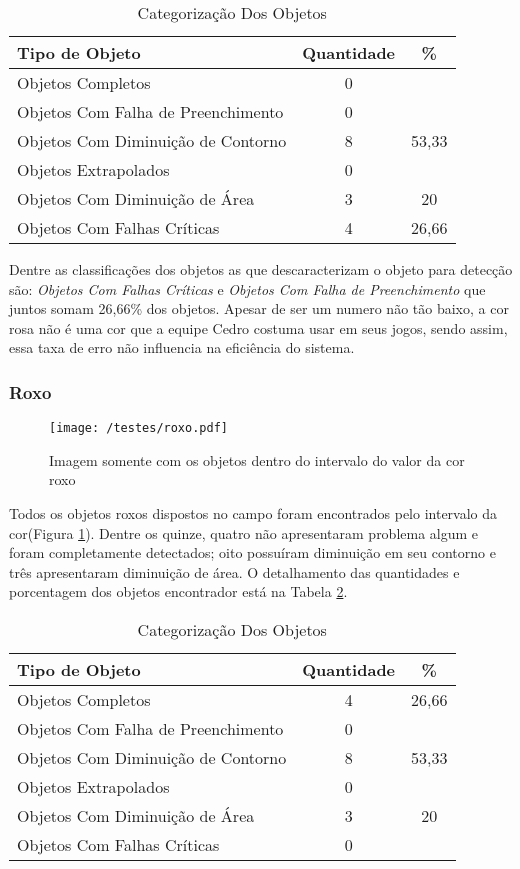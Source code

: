 	\begin{table}[h]
\centering
\begin{tabular}{l|c|c}
Tipo de Objeto & Quantidade  & \% \\ %
\hline                               %
Objetos Completos &  0\\
\hline 
Objetos Com Falha de Preenchimento & 0\\
\hline 
Objetos Com Diminuição de Contorno & 8& 53,33
 \\
\hline 
Objetos Extrapolados & 0 \\
\hline 
Objetos Com Diminuição de Área & 3 & 20\\
\hline 
Objetos Com Falhas Críticas & 4 & 26,66 \\
\hline 
\end{tabular}
\caption{Categorização Dos Objetos}
\label{tab:rosa}
\end{table}

Dentre as classificações dos objetos as que descaracterizam o objeto para detecção são:  \textit{Objetos Com Falhas Críticas} e \textit{Objetos Com Falha de Preenchimento} que juntos somam 26,66\% dos objetos. Apesar de ser um numero não tão baixo, a cor rosa não é uma cor que a equipe Cedro costuma usar em seus jogos, sendo assim, essa taxa de erro não influencia na eficiência do sistema.
\subsubsection{Roxo}
\begin{figure}[H]
		\centering
		\texttt{[image: /testes/roxo.pdf]}
		\caption{Imagem somente com os objetos dentro do intervalo do valor da cor roxo}
		\label{fig:roxo}
	\end{figure}

Todos os objetos roxos dispostos no campo foram encontrados pelo intervalo da cor(Figura \ref{fig:roxo}). Dentre os quinze, quatro não apresentaram problema algum e foram completamente detectados; oito possuíram diminuição em seu contorno e três apresentaram diminuição de área. O detalhamento das quantidades e porcentagem dos objetos encontrador está na Tabela \ref{tab:roxo}.
\begin{table}[H]
\centering
\begin{tabular}{l|c|c}
Tipo de Objeto & Quantidade  & \% \\ %
\hline                               %
Objetos Completos &  4 & 26,66\\
\hline 
Objetos Com Falha de Preenchimento & 0 \\
\hline 
Objetos Com Diminuição de Contorno &  8 & 53,33\\
\hline 
Objetos Extrapolados & 0 \\
\hline 
Objetos Com Diminuição de Área & 3 & 20\\
\hline 
Objetos Com Falhas Críticas & 0 \\
\hline 
\end{tabular}
\caption{Categorização Dos Objetos}
\label{tab:roxo}
\end{table}
	

